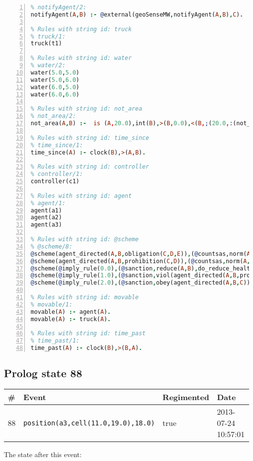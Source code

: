 \documentclass[11pt]{article}\usepackage[utf8]{inputenc}\usepackage{geometry}
\begin{document}
\begin{lstlisting}[language=Prolog, numbers=left]
% Rules with string id: notifyAgent
% notifyAgent/2:
notifyAgent(A,B) :- @external(geoSenseMW,notifyAgent(A,B),C).

% Rules with string id: truck
% truck/1:
truck(t1)

% Rules with string id: water
% water/2:
water(5.0,5.0)
water(5.0,6.0)
water(6.0,5.0)
water(6.0,6.0)

% Rules with string id: not_area
% not_area/2:
not_area(A,B) :-  is (A,20.0),int(B),>(B,0.0),<(B,;(20.0,:(not_area(A,B), is (-(B),20.0)))),int(A),>(A,0.0),<(A,;(20.0,:(area(A,B),-(int(A))))),int(B),>(A,0.0),>(B,0.0),<(A,21.0),<(B,21.0).

% Rules with string id: time_since
% time_since/1:
time_since(A) :- clock(B),>(A,B).

% Rules with string id: controller
% controller/1:
controller(c1)

% Rules with string id: agent
% agent/1:
agent(a1)
agent(a2)
agent(a3)

% Rules with string id: @scheme
% @scheme/8:
@scheme(agent_directed(A,B,obligation(C,D,E)),(@countsas,norm(A,B,F,obligation(C,D,E)),F),false,(listTrue(C)),(time_past(D)),false,[plus(viol(agent_directed(A,B,obligation(C,D,E))))|[]],[plus(obey(agent_directed(A,B,obligation(C,D,E))))|[]])
@scheme(agent_directed(A,B,prohibition(C,D)),(@countsas,norm(A,B,E,prohibition(C,D)),E),(listTrue(C)),false,(false),false,[plus(viol(agent_directed(A,B,prohibition(C,D))))|[]],[plus(obey(agent_directed(A,B,prohibition(C,D))))|[]])
@scheme(@imply_rule(0.0),(@sanction,reduce(A,B),do_reduce_health(A,B),notifyAgent(A,changed(status))),true,false,false,false,[min(reduce(A,B))|[]],[])
@scheme(@imply_rule(1.0),(@sanction,viol(agent_directed(A,B,prohibition(C,D))),do_sanction(D)),true,false,false,false,[min(viol(agent_directed(A,B,prohibition(C,D))))|[]],[])
@scheme(@imply_rule(2.0),(@sanction,obey(agent_directed(A,B,C))),true,false,false,false,[min(obey(agent_directed(A,B,C)))|[]],[])

% Rules with string id: movable
% movable/1:
movable(A) :- agent(A).
movable(A) :- truck(A).

% Rules with string id: time_past
% time_past/1:
time_past(A) :- clock(B),>(B,A).

\end{lstlisting}
\clearpage 
\subsection{Prolog state 88}
\begin{table}[ht]
\centering 
\begin{tabular}{l l l l} 
\textbf{\#} & \textbf{Event} & \textbf{Regimented} & \textbf{Date} \\ [0.5ex] 
\hline
88&\texttt{position(a3,cell(11.0,19.0),18.0)}&true&2013-07-24 10:57:01\\ [1ex] \hline\end{tabular}
\end{table}
The state after this event:
\end{document}
